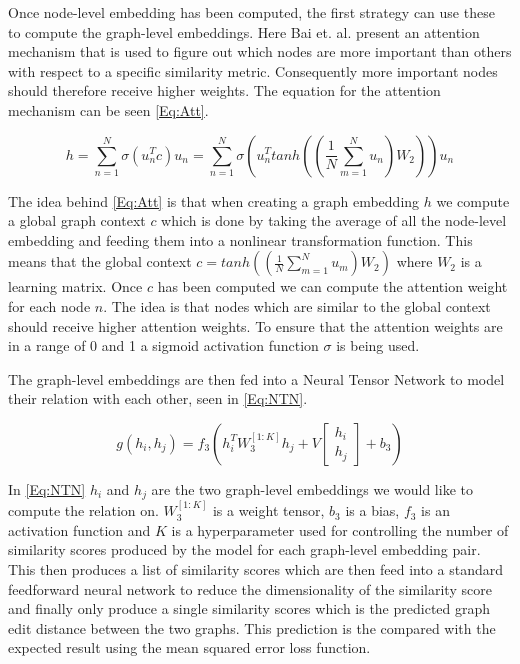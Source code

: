 Once node-level embedding has been computed, the first strategy can use these to compute the graph-level embeddings. Here Bai et. al. present an attention mechanism that is used to figure out which nodes are more important than others with respect to a specific similarity metric. Consequently more important nodes should therefore receive higher weights\cite{Bai2018}. The equation for the attention mechanism can be seen \autoref{Eq:Att}.



\begin{equation}\label{Eq:Att}
h= \sum^N_{n=1} \sigma(u^T_nc)u_n=\sum^N_{n=1}\sigma(u^T_ntanh((\frac{1}{N}\sum_{m=1}^Nu_n)W_2))u_n
\end{equation}

The idea behind \autoref{Eq:Att} is that when creating a graph embedding $h$ we compute a global graph context $c$ which is done by taking the average of all the node-level embedding and feeding them into a nonlinear transformation function. This means that the global context $c=tanh((\frac{1}{N}\sum_{m=1}^Nu_m)W_2)$ where $W_2$ is a learning matrix. Once $c$ has been computed we can compute the attention weight for each node $n$. The idea is that nodes which are similar to the global context should receive higher attention weights. To ensure that the attention weights are in a range of 0 and 1 a sigmoid activation function $\sigma$ is being used\cite{Bai2018}.


The graph-level embeddings are then fed into a Neural Tensor Network to model their relation with each other, seen in \autoref{Eq:NTN}.


\begin{equation}\label{Eq:NTN}
g(h_i,h_j) = f_3(h_i^TW_3^{[1:K]}h_j+V\begin{bmatrix}h_i \\ h_j \end{bmatrix} + b_3)
\end{equation}

In \autoref{Eq:NTN} $h_i$ and $h_j$ are the two graph-level embeddings we would like to compute the relation on. $W_3^{[1:K]}$ is a weight tensor, $b_3$ is a bias,  $f_3$ is an activation function and $K$ is a hyperparameter used for controlling the number of similarity scores produced by the model for each graph-level embedding pair\cite{Bai2018}. This then produces a list of similarity scores which are then feed into a standard feedforward neural network to reduce the dimensionality of the similarity score and finally only produce a single similarity scores which is the predicted graph edit distance between the two graphs. This prediction is the compared with the expected result using the mean squared error loss function\cite{Bai2018}.


